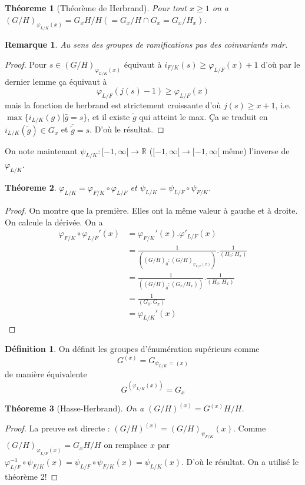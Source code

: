 \documentclass[a4paper,12pt]{book}
\newcommand{\R}{\mathbb{R}}
\theoremstyle{plain}
\newtheorem{thm}{Théoreme}
\newtheorem{rem}{Remarque}
\theoremstyle{definition}
\newtheorem{defn}{Définition}
\theoremstyle{remark}
\begin{document}
\begin{thm}[Théorème de Herbrand]
    Pour tout $x\geq 1$ on a $(G/H)_{\varphi_{L/K}(x)}=G_xH/H(=
    G_x/H\cap G_x=G_x/H_x)$.
\end{thm}
\begin{rem}
    Au sens des groupes de ramifications pas des coinvariants mdr.
\end{rem}
\begin{proof}
    Pour $s\in (G/H)_{\varphi_{L/K}(x)}$ équivaut à 
    $i_{F/K}(s)\geq \varphi_{L/F}(x)+1$ d'où par le dernier
    lemme ça équivaut à
    \[\varphi_{L/F}(j(s)-1)\geq \varphi_{L/F}(x)\]
    mais la fonction de herbrand est strictement croissante d'où
    $j(s)\geq x+1$, i.e. $\max\{i_{L/K}(g)|\bar g=s\}$, et
    il existe $\tilde g$ qui atteint le max. Ça se traduit en
    $i_{L/K}(\tilde g)\in G_x$ et $\overline{\tilde g}=s$. D'où
    le résultat.
\end{proof}
On note maintenant $\psi_{L/K}\colon [-1,\infty[\to \R$ ($[-1,\infty[\to [-1,\infty[$ même) l'inverse de $\varphi_{L/K}$.
\begin{thm}
    $\varphi_{L/K}=\varphi_{F/K}\circ\varphi_{L/F}$ et
    $\psi_{L/K}=\psi_{L/F}\circ\psi_{F/K}$.
\end{thm}
\begin{proof}
    On montre que la première. Elles ont la même valeur à gauche
    et à droite. On calcule la dérivée. On a
    \begin{align*}
        \varphi_{F/K}\circ\varphi_{L/F}'(x)&=\varphi_{F/K}'(x).\varphi'_{L/F}(x)\\
                                           &=\frac{1}{((G/H)_0\colon (G/H)_{\varphi_{L/F}(x)})}.\frac{1}{(H_0:H_x)}\\
                                           &=\frac{1}{((G/H)_0:(G_x/H_x))}.\frac{1}{(H_0:H_x)}\\
                                           &=\frac{1}{(G_0:G_x)}\\
                                           &=\varphi_{L/K}'(x)
    \end{align*}

\end{proof}
\begin{defn}
    On définit les groupes d'énumération supérieurs comme
    \[G^{(x)}=G_{\psi_{L/K}=(x)}\]
    de manière équivalente 
    \[G^{(\varphi_{L/K}(x))}=G_x\]
\end{defn}
\begin{thm}[Hasse-Herbrand]
    On a $(G/H)^{(x)}=G^{(x)}H/H$.
\end{thm}
\begin{proof}
    La preuve est directe : $(G/H)^{(x)}=(G/H)_{\psi_{F/K}}(x)$.
    Comme $(G/H)_{\varphi_{L/F}(x)}=G_xH/H$ on remplace $x$
    par
    $\varphi^{-1}_{L/F}\circ \psi_{F/K}(x)=\psi_{L/F}\circ\psi_{F/K}(x)=\psi_{L/K}(x)$. D'où le résultat. On a utilisé
    le théorème 2!
\end{proof}
\end{document}
